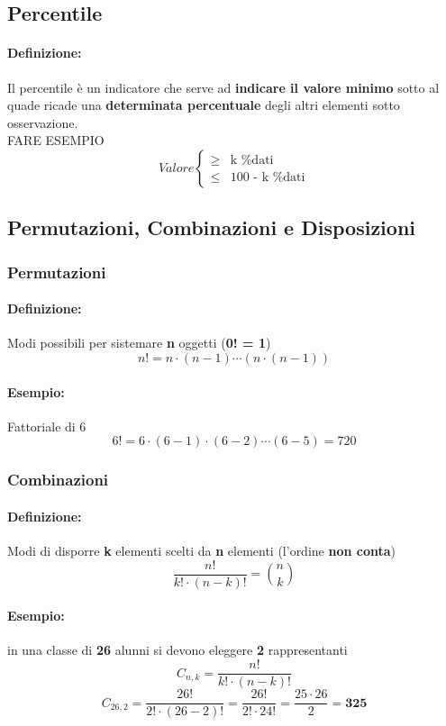 \documentclass[]{article}
\newcommand{\definizione}{\paragraph{Definizione:}}
\begin{document}
    \subsection{Percentile}
    \definizione Il percentile è un indicatore che serve ad \textbf{indicare il valore minimo} sotto al quade ricade una \textbf{determinata percentuale} degli altri elementi sotto osservazione.
    \\ FARE ESEMPIO
    \begin{equation*}
        Valore
        \begin{cases}
            \geq & \text{k \% dati} \\
            \leq & \text{100 - k \% dati}
        \end{cases}
    \end{equation*}

    \subsection{Permutazioni, Combinazioni e Disposizioni}
    \subsubsection{Permutazioni}
    \definizione Modi possibili per sistemare \textbf{n} oggetti (\textbf{0! = 1})
    \[ n! = n \cdot (n-1) \cdots (n \cdot (n-1)) \]
    \paragraph{Esempio:} Fattoriale di 6
    \[ 6! = 6 \cdot (6-1) \cdot (6-2) \cdots (6-5) = 720 \]

    \subsubsection{Combinazioni}
    \definizione Modi di disporre \textbf{k} elementi scelti da \textbf{n} elementi (l'ordine \textbf{non conta})
    \[ \frac{n!}{k! \cdot (n-k)!} = \binom{n}{k} \]

    \paragraph{Esempio:} in una classe di \textbf{26} alunni si devono eleggere \textbf{2} rappresentanti
    \[ C_{n,k} = \frac{n!}{k! \cdot (n-k)!} \]
    \[ C_{26,2} = \frac{26!}{2! \cdot (26-2)!} = \frac{26!}{2! \cdot 24!} = \frac{25 \cdot 26}{2} = \textbf{325} \]
    \begin{center} 
    \end{center}
\end{document}
